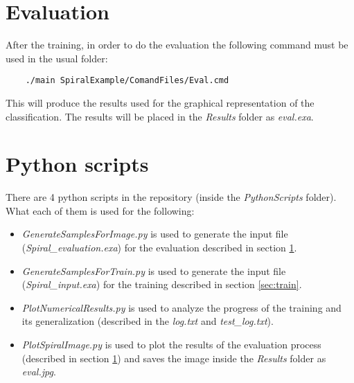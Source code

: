 \documentclass{article}
\begin{document}
\section{Evaluation} \label{sec:eval}
After the training, in order to do the evaluation the following command must be used in the usual folder: 

\begin{verbatim}
	./main SpiralExample/ComandFiles/Eval.cmd
\end{verbatim}

This will produce the results used for the graphical representation of the classification. The results will be placed in the \textit{Results} folder as \textit{eval.exa}.

\section{Python scripts}
There are 4 python scripts in the repository (inside the \textit{PythonScripts} folder). What each of them is used for the following:

\begin{itemize}
	\item \textit{GenerateSamplesForImage.py} is used to generate the input file (\textit{Spiral\_evaluation.exa}) for the evaluation described in section \ref{sec:eval}.
	
	\item \textit{GenerateSamplesForTrain.py} is used to generate the input file (\textit{Spiral\_input.exa}) for the training described in section \ref{sec:train}.
	
	\item \textit{PlotNumericalResults.py} is used to analyze the progress of the training and its generalization (described in the \textit{log.txt} and \textit{test\_log.txt}).
	
	\item \textit{PlotSpiralImage.py} is used to plot the results of the evaluation process (described in section \ref{sec:eval}) and saves the image inside the \textit{Results} folder as \textit{eval.jpg}.
\end{itemize}
	
\end{document}
